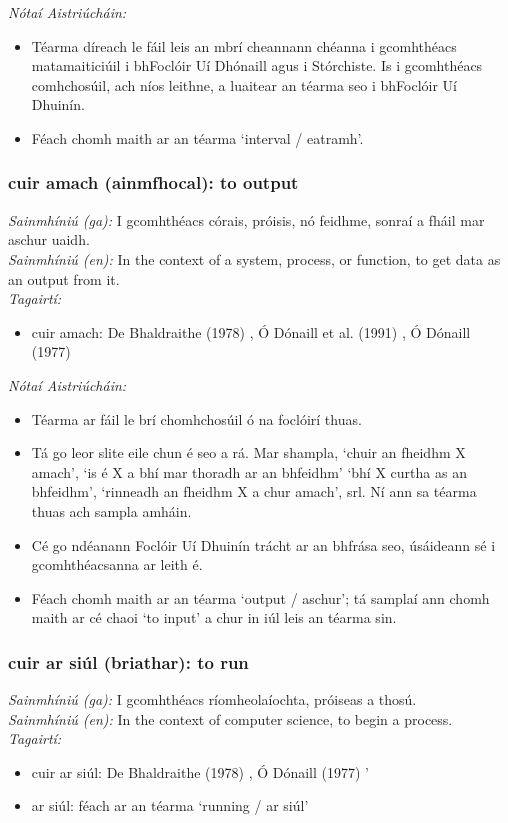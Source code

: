  \noindent \textit{Nótaí Aistriúcháin:}
\begin{itemize}
	\item Téarma díreach le fáil leis an mbrí cheannann chéanna i gcomhthéacs matamaiticiúil i bhFoclóir Uí Dhónaill agus i Stórchiste. Is i gcomhthéacs comhchosúil, ach níos leithne, a luaitear an téarma seo i bhFoclóir Uí Dhuinín.
	\item Féach chomh maith ar an téarma `interval / eatramh'.
\end{itemize}


\subsubsection*{cuir amach (ainmfhocal): to output}
 \noindent \textit{Sainmhíniú (ga):} I gcomhthéacs córais, próisis, nó feidhme, sonraí a fháil mar aschur uaidh.
\\
 \noindent \textit{Sainmhíniú (en):} In the context of a system, process, or function, to get data as an output from it.
\\
 \noindent \textit{Tagairtí:}
\begin{itemize}
	\item cuir amach: De Bhaldraithe (1978) \cite{de-bhaldraithe}, Ó Dónaill et al. (1991) \cite{focloir-beag}, Ó Dónaill (1977) \cite{odonaill}
\end{itemize}

 \noindent \textit{Nótaí Aistriúcháin:}
\begin{itemize}
	\item Téarma ar fáil le brí chomhchosúil ó na foclóirí thuas.
	\item Tá go leor slite eile chun é seo a rá. Mar shampla, `chuir an fheidhm X amach', `is é X a bhí mar thoradh ar an bhfeidhm' `bhí X curtha as an bhfeidhm', `rinneadh an fheidhm X a chur amach', srl. Ní ann sa téarma thuas ach sampla amháin.
	\item Cé go ndéanann Foclóir Uí Dhuinín trácht ar an bhfrása seo, úsáideann sé i gcomhthéacsanna ar leith é.
	\item Féach chomh maith ar an téarma `output / aschur'; tá samplaí ann chomh maith ar cé chaoi `to input' a chur in iúl leis an téarma sin.
\end{itemize}


\subsubsection*{cuir ar siúl (briathar): to run}
 \noindent \textit{Sainmhíniú (ga):} I gcomhthéacs ríomheolaíochta, próiseas a thosú.
\\
 \noindent \textit{Sainmhíniú (en):} In the context of computer science, to begin a process.
\\
 \noindent \textit{Tagairtí:}
\begin{itemize}
	\item cuir ar siúl: De Bhaldraithe (1978) \cite{de-bhaldraithe}, Ó Dónaill (1977) \cite{odonaill}'
	\item ar siúl: féach ar an téarma `running / ar siúl'
\end{itemize}

